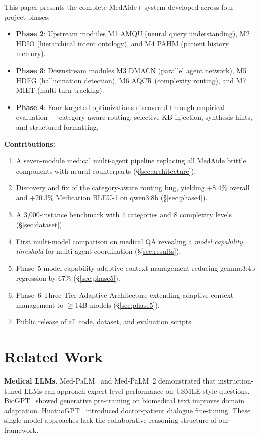 \documentclass[conference]{IEEEtran}
\begin{document}
This paper presents the complete MedAide+ system developed across four project phases:
\begin{itemize}
    \item \textbf{Phase 2}: Upstream modules M1 AMQU (neural query understanding), M2 HDIO (hierarchical intent ontology), and M4 PAHM (patient history memory).
    \item \textbf{Phase 3}: Downstream modules M3 DMACN (parallel agent network), M5 HDFG (hallucination detection), M6 AQCR (complexity routing), and M7 MIET (multi-turn tracking).
    \item \textbf{Phase 4}: Four targeted optimizations discovered through empirical evaluation — category-aware routing, selective KB injection, synthesis hints, and structured formatting.
\end{itemize}

\noindent\textbf{Contributions:}
\begin{enumerate}
    \item A seven-module medical multi-agent pipeline replacing all MedAide brittle components with neural counterparts (\S\ref{sec:architecture}).
    \item Discovery and fix of the category-aware routing bug, yielding $+8.4$\% overall and $+20.3$\% Medication BLEU-1 on qwen3:8b (\S\ref{sec:phase4}).
    \item A 3,000-instance benchmark with 4 categories and 8 complexity levels (\S\ref{sec:dataset}).
    \item First multi-model comparison on medical QA revealing a \textit{model capability threshold} for multi-agent coordination (\S\ref{sec:results}).
    \item Phase~5 model-capability-adaptive context management reducing gemma3:4b regression by 67\% (\S\ref{sec:phase5}).
    \item Phase~6 Three-Tier Adaptive Architecture extending adaptive context management to $\geq$14B models (\S\ref{sec:phase5}).
    \item Public release of all code, dataset, and evaluation scripts.
\end{enumerate}

\section{Related Work}
\label{sec:related}

\textbf{Medical LLMs.} Med-PaLM~\cite{singhal2023medpalm} and Med-PaLM~2 demonstrated that instruction-tuned LLMs can approach expert-level performance on USMLE-style questions. BioGPT~\cite{luo2022biogpt} showed generative pre-training on biomedical text improves domain adaptation. HuatuoGPT~\cite{zhang2023huatuogpt} introduced doctor-patient dialogue fine-tuning. These single-model approaches lack the collaborative reasoning structure of our framework.
\end{document}
